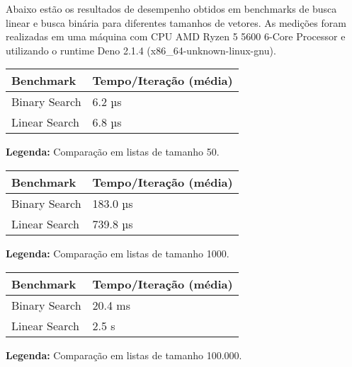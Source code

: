 Abaixo estão os resultados de desempenho obtidos em benchmarks de busca linear e 
busca binária para diferentes tamanhos de vetores. As medições foram realizadas 
em uma máquina com CPU AMD Ryzen 5 5600 6-Core Processor e utilizando o runtime 
Deno 2.1.4 (x86\_64-unknown-linux-gnu).

\vspace{5mm}

\begin{tabular}{|l|l|}
\hline
\textbf{Benchmark} & \textbf{Tempo/Iteração (média)} \\
\hline
Binary Search & 6.2 µs \\
Linear Search & 6.8 µs \\
\hline
\end{tabular}

\vspace{1mm}

\textbf{Legenda:} Comparação em listas de tamanho 50.

\vspace{5mm}

\begin{tabular}{|l|l|}
\hline
\textbf{Benchmark} & \textbf{Tempo/Iteração (média)} \\
\hline
Binary Search & 183.0 µs \\
Linear Search & 739.8 µs \\
\hline
\end{tabular}

\textbf{Legenda:} Comparação em listas de tamanho 1000.

\vspace{5mm}

\begin{tabular}{|l|l|}
\hline
\textbf{Benchmark} & \textbf{Tempo/Iteração (média)} \\
\hline
Binary Search & 20.4 ms \\
Linear Search & 2.5 s \\
\hline
\end{tabular}

\textbf{Legenda:} Comparação em listas de tamanho 100.000.

\vspace{5mm}
